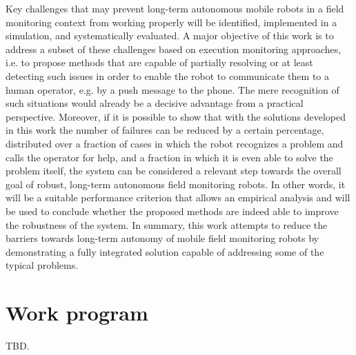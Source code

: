 \documentclass[english, master, expose, utf8]{base/thesis_KBS}
\begin{document}
Key challenges that may prevent long-term autonomous mobile robots in a field monitoring context from working properly will be identified, implemented 
in a simulation, and systematically evaluated. A major objective of this work is to address a subset of these challenges based on execution monitoring approaches,
i.e. to propose methods that are capable of partially resolving or at least detecting such issues in order to enable the robot to communicate them to a human operator,
e.g. by a push message to the phone. The mere recognition of such situations would already be a decisive advantage from a practical perspective. Moreover, if it is possible
to show that with the solutions developed in this work the number of failures can be reduced by a certain percentage, distributed over a fraction of cases in which the robot 
recognizes a problem and calls the operator for help, and a fraction in which it is even able to solve the problem itself, the system can be considered a relevant step towards 
the overall goal of robust, long-term autonomous field monitoring robots. In other words, it will be a suitable performance criterion that allows an empirical analysis
and will be used to conclude whether the proposed methods are indeed able to improve the robustness of the system.
In summary, this work attempts to reduce the barriers towards long-term autonomy of mobile field monitoring robots by demonstrating a fully integrated solution capable
of addressing some of the typical problems.

\section{Work program}

TBD.


\end{document}
